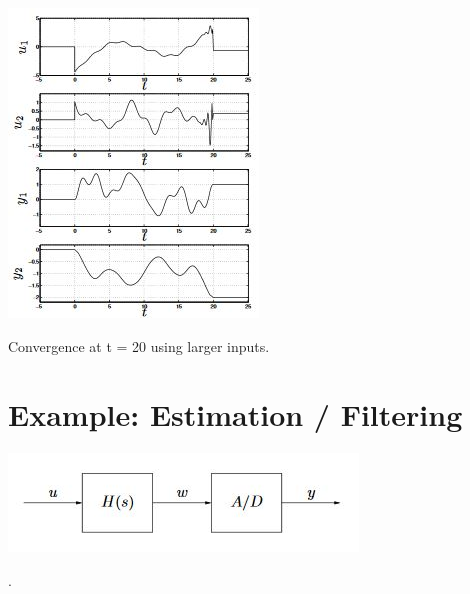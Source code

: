\documentclass{../tufte-handout}
\begin{document}
\begin{marginfigure}
  \includegraphics[width=\linewidth]{faster_convergence}
  \caption{Convergence at t = 20 using larger inputs.}
  \label{fig:faster_convergence}
\end{marginfigure}

\newpage
\section{Example: Estimation / Filtering}

\begin{marginfigure}
  \includegraphics[width=\linewidth]{estimation}
  \caption{.}
  \label{fig:estimation}
\end{marginfigure}
\end{document}
